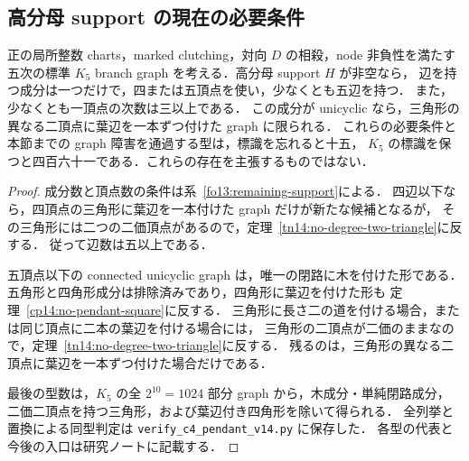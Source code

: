 \subsection{高分母 support の現在の必要条件}
\label{sf14:section}

\begin{corollary}
\label{sf14:remaining-support}
正の局所整数 charts，marked clutching，対向 $D$ の相殺，node 非負性を満たす
五次の標準 $K_5$ branch graph を考える．高分母 support $H$ が非空なら，
辺を持つ成分は一つだけで，四または五頂点を使い，少なくとも五辺を持つ．
また，少なくとも一頂点の次数は三以上である．
この成分が unicyclic なら，三角形の異なる二頂点に葉辺を一本ずつ付けた graph に限られる．
これらの必要条件と本節までの graph 障害を通過する型は，標識を忘れると十五，
$K_5$ の標識を保つと四百六十一である．これらの存在を主張するものではない．
\end{corollary}

\begin{proof}
成分数と頂点数の条件は系~\ref{fo13:remaining-support}による．
四辺以下なら，四頂点の三角形に葉辺を一本付けた graph だけが新たな候補となるが，
その三角形には二つの二価頂点があるので，定理~\ref{tn14:no-degree-two-triangle}に反する．
従って辺数は五以上である．

五頂点以下の connected unicyclic graph は，唯一の閉路に木を付けた形である．
五角形と四角形成分は排除済みであり，四角形に葉辺を付けた形も
定理~\ref{cp14:no-pendant-square}に反する．
三角形に長さ二の道を付ける場合，または同じ頂点に二本の葉辺を付ける場合には，
三角形の二頂点が二価のままなので，定理~\ref{tn14:no-degree-two-triangle}に反する．
残るのは，三角形の異なる二頂点に葉辺を一本ずつ付けた場合だけである．

最後の型数は，$K_5$ の全 $2^{10}=1024$ 部分 graph から，木成分・単純閉路成分，
二価二頂点を持つ三角形，および葉辺付き四角形を除いて得られる．
全列挙と置換による同型判定は
\nolinkurl{verify_c4_pendant_v14.py} に保存した．
各型の代表と今後の入口は研究ノートに記載する．
\end{proof}
